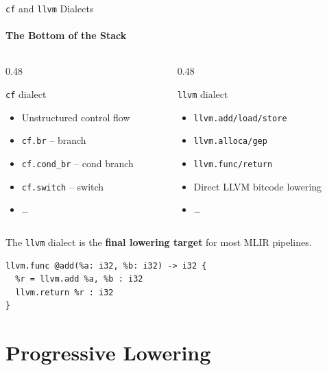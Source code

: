 \begin{frame}[fragile]{\texttt{cf} and \texttt{llvm} Dialects}
  \framesubtitle{The Bottom of the Stack}
  \begin{columns}
    \begin{column}{0.48\textwidth}
      \begin{exampleblock}{\texttt{cf} dialect}
        {\small
        \begin{itemize}
          \item Unstructured control flow
          \item \texttt{cf.br} -- branch
          \item \texttt{cf.cond\_br} -- cond branch
          \item \texttt{cf.switch} -- switch
          \item \ldots
        \end{itemize}
        }
      \end{exampleblock}
    \end{column}
    \begin{column}{0.48\textwidth}
      \begin{block}{\texttt{llvm} dialect}
        {\small
        \begin{itemize}
          \item \texttt{llvm.add/load/store}
          \item \texttt{llvm.alloca/gep}
          \item \texttt{llvm.func/return}
          \item Direct LLVM bitcode lowering
          \item \ldots
        \end{itemize}
        }
      \end{block}
    \end{column}
  \end{columns}

  \bigskip
  The \texttt{llvm} dialect is the
  \textbf{\textcolor{mainAccent}{final lowering target}} for most MLIR pipelines.

\begin{lstlisting}[language=none,basicstyle=\ttfamily\small]
llvm.func @add(%a: i32, %b: i32) -> i32 {
  %r = llvm.add %a, %b : i32
  llvm.return %r : i32
}
\end{lstlisting}
\end{frame}


\section{Progressive Lowering}


